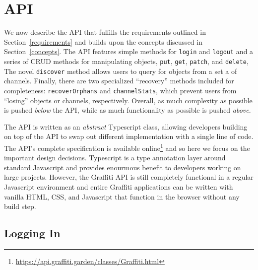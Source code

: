 \section{API}

We now describe the API that fulfills the requirements
outlined in Section~\ref{requirements} and builds upon the concepts
discussed in Section~\ref{concepts}.
The API features simple methods for \texttt{login} and \texttt{logout}
and a series of CRUD methods for manipulating objects,
\texttt{put}, \texttt{get}, \texttt{patch}, and \texttt{delete},
The novel \texttt{discover} method allows users to query for objects
from a set a of channels.
Finally, there are two specialized ``recovery'' methods included for completeness:
\texttt{recoverOrphans} and \texttt{channelStats},
which prevent users from ``losing'' objects or channels, respectively.
Overall, as much complexity as possible is pushed \emph{below} the API,
while as much functionality as possible is pushed \emph{above}.

The API is written as an \emph{abstract} Typescript class, allowing
developers building on top of the API to swap out different implementation
with a single line of code.
The API's complete specification is available online\footnote{
    \url{https://api.graffiti.garden/classes/Graffiti.html}
} and so here we focus on the important design decisions.
Typescript is a type annotation layer around standard Javascript
and provides enourmous benefit to developers working on large projects.
However, the Graffiti API is still completely functional
in a regular Javascript environment and entire Graffiti applications can be written
with vanilla HTML, CSS, and Javascript that function in the browser without
any build step.



\subsection{Logging In}


